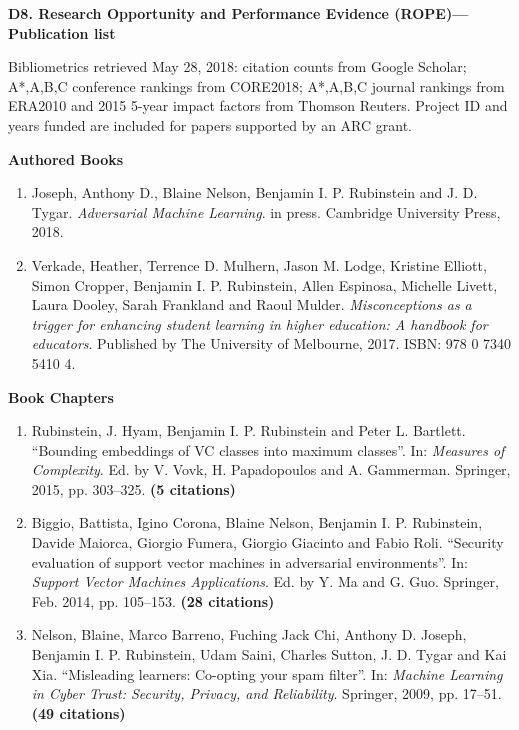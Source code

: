 \documentclass[a4paper,12pt]{article}
\title{}
\author{}
\date{}
\begin{document}
 \setcounter{list}{0}

\noindent \textbf{D8. Research Opportunity and Performance Evidence (ROPE)---Publication list}

\noindent Bibliometrics retrieved May 28, 2018: citation counts from
Google Scholar; A*,A,B,C conference rankings from CORE2018; A*,A,B,C
journal rankings from ERA2010 and 2015 5-year impact factors from
Thomson Reuters. Project ID and years funded are included for papers
supported by an ARC grant.

\noindent\textbf{Authored Books}

\begin{enumerate}
\setcounter{enumi}{\value{list}}

\item Joseph, Anthony D., Blaine Nelson, Benjamin I. P. Rubinstein and J. D. Tygar.
\emph{Adversarial Machine Learning}.
in press.
Cambridge University Press, 2018.

\item Verkade, Heather, Terrence D. Mulhern, Jason M. Lodge, Kristine Elliott, Simon Cropper, Benjamin I. P. Rubinstein, Allen Espinosa, Michelle Livett, Laura Dooley, Sarah Frankland and Raoul Mulder.
\emph{Misconceptions as a trigger for enhancing student learning in higher education: A handbook for educators}.
Published by The University of Melbourne, 2017.
ISBN: 978 0 7340 5410 4.


\setcounter{list}{\value{enumi}}
\end{enumerate}

\noindent\textbf{Book Chapters}

\begin{enumerate}
\setcounter{enumi}{\value{list}}

\item Rubinstein, J. Hyam, Benjamin I. P. Rubinstein and Peter L. Bartlett.
``Bounding embeddings of VC classes into maximum classes''.
In: 
\emph{Measures of Complexity}.
Ed. by V. Vovk, H. Papadopoulos and A. Gammerman.
Springer, 2015, pp. 303--325.
 \textbf{(5 citations)}
\item Biggio, Battista, Igino Corona, Blaine Nelson, Benjamin I. P. Rubinstein, Davide Maiorca, Giorgio Fumera, Giorgio Giacinto and Fabio Roli.
``Security evaluation of support vector machines in adversarial environments''.
In: 
\emph{Support Vector Machines Applications}.
Ed. by Y. Ma and G. Guo.
Springer, Feb. 2014, pp. 105--153.
 \textbf{(28 citations)}
\item Nelson, Blaine, Marco Barreno, Fuching Jack Chi, Anthony D. Joseph, Benjamin I. P. Rubinstein, Udam Saini, Charles Sutton, J. D. Tygar and Kai Xia.
``Misleading learners: Co-opting your spam filter''.
In: 
\emph{Machine Learning in Cyber Trust: Security, Privacy, and Reliability}.
Springer, 2009, pp. 17--51.
 \textbf{(49 citations)}

\setcounter{list}{\value{enumi}}
\end{enumerate}
\end{document}
